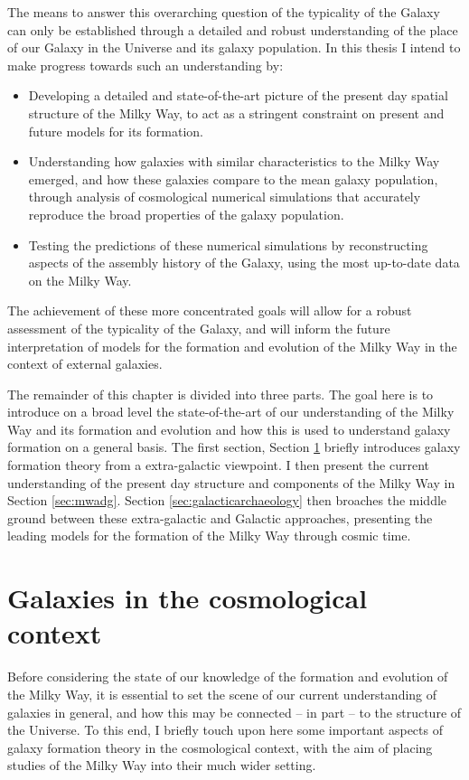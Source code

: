 The means to answer this overarching question of the typicality of the Galaxy can only be established through a detailed and robust understanding of the place of our Galaxy in the Universe and its galaxy population. In this thesis I intend to make progress towards such an understanding by:
\begin{itemize}
    \item Developing a detailed and state-of-the-art picture of the present day spatial structure of the Milky Way, to act as a stringent constraint on present and future models for its formation.
    \item Understanding how galaxies with similar characteristics to the Milky Way emerged, and how these galaxies compare to the mean galaxy population, through analysis of cosmological numerical simulations that accurately reproduce the broad properties of the galaxy population.
    \item Testing the predictions of these numerical simulations by reconstructing aspects of the assembly history of the Galaxy, using the most up-to-date data on the Milky Way.
\end{itemize}
The achievement of these more concentrated goals will allow for a robust assessment of the typicality of the Galaxy, and will inform the future interpretation of models for the formation and evolution of the Milky Way in the context of external galaxies.

The remainder of this chapter is divided into three parts. The goal here is to introduce on a broad level the state-of-the-art of our understanding of the Milky Way and its formation and evolution and how this is used to understand galaxy formation on a general basis. The first section, Section \ref{sec:cosmocontext} briefly introduces galaxy formation theory from a extra-galactic viewpoint. I then present the current understanding of the present day structure and components of the Milky Way in Section \ref{sec:mwadg}. Section \ref{sec:galacticarchaeology} then broaches the middle ground between these extra-galactic and Galactic approaches, presenting the leading models for the formation of the Milky Way through cosmic time.

\section{Galaxies in the cosmological context}
\label{sec:cosmocontext}
Before considering the state of our knowledge of the formation and evolution of the Milky Way, it is essential to set the scene of our current understanding of galaxies in general, and how this may be connected -- in part -- to the structure of the Universe. To this end, I briefly touch upon here some important aspects of galaxy formation theory in the cosmological context, with the aim of placing studies of the Milky Way into their much wider setting.

